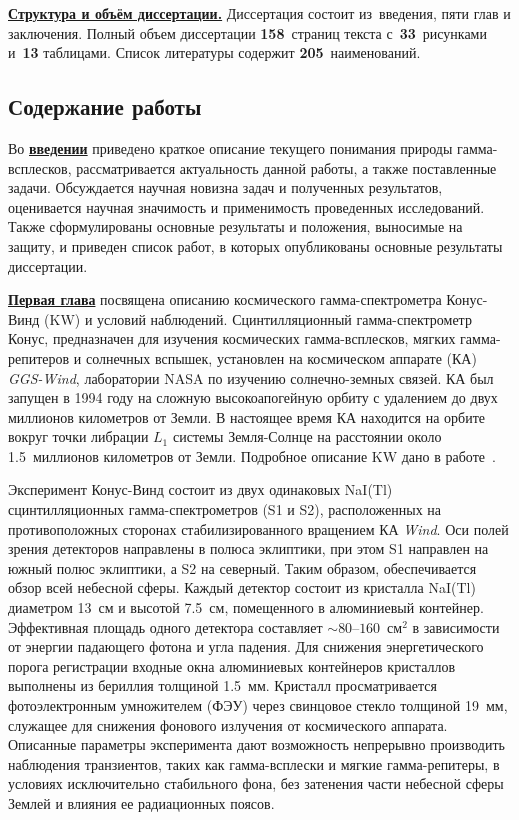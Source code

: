 

\underline{\textbf{Структура и объём диссертации.}} Диссертация состоит из~введения, 
пяти глав и заключения. Полный объем диссертации \textbf{158}~страниц текста 
с~\textbf{33}~рисунками и~\textbf{13} таблицами. Список литературы содержит \textbf{205}~наименований.

\subsection*{\Large Содержание работы}
Во \underline{\textbf{введении}} приведено краткое описание текущего понимания природы гамма-всплесков,
рассматривается актуальность данной работы, а также поставленные задачи. 
Обсуждается научная новизна задач и полученных результатов, 
оценивается научная значимость и применимость проведенных исследований.
Также сформулированы основные результаты и положения, выносимые на защиту, и приведен
список работ, в которых опубликованы основные результаты диссертации.

\underline{\textbf{Первая глава}} посвящена описанию космического гамма-спектрометра
Конус-Винд (KW) и условий наблюдений. 
Сцинтилляционный гамма-спектрометр Конус, предназначен для изучения космических 
гамма-всплесков, мягких гамма-репитеров и солнечных вспышек,
установлен на космическом аппарате (КА) \textit{GGS-Wind}, лаборатории NASA по изучению 
солнечно-земных связей. КА был запущен в 1994 году на сложную высокоапогейную орбиту 
с удалением до двух миллионов километров от Земли. В настоящее время КА находится 
на орбите вокруг точки либрации $L_1$ системы Земля-Солнце на расстоянии около 
1.5~миллионов километров от Земли.
Подробное описание KW дано в работе~\citep{Aptekar_1995SSR}.

Эксперимент Конус-Винд состоит из двух одинаковых NaI(Tl) сцинтилляционных 
гамма-спектрометров (S1 и S2), расположенных на противоположных сторонах 
стабилизированного вращением КА \textit{Wind}. 
Оси полей зрения детекторов 
направлены в полюса эклиптики, при этом S1 направлен на южный полюс эклиптики, 
а S2 на северный. Таким образом, обеспечивается обзор всей небесной сферы. 
Каждый детектор состоит из кристалла NaI(Tl) диаметром 13~см и высотой 7.5~см, 
помещенного в алюминиевый контейнер.
Эффективная площадь одного детектора составляет $\sim 80\textrm{--}160$~см$^2$ в 
зависимости от энергии падающего фотона и угла падения.  
Для снижения энергетического порога регистрации входные окна алюминиевых 
контейнеров кристаллов выполнены из бериллия толщиной 1.5~мм. 
Кристалл просматривается фотоэлектронным 
умножителем (ФЭУ) через свинцовое стекло толщиной 19~мм, служащее для снижения фонового 
излучения от космического аппарата. Описанные параметры эксперимента дают 
возможность непрерывно производить наблюдения транзиентов, таких как гамма-всплески 
и мягкие гамма-репитеры, в условиях исключительно стабильного фона, 
без затенения части небесной сферы Землей и влияния ее радиационных поясов. 

